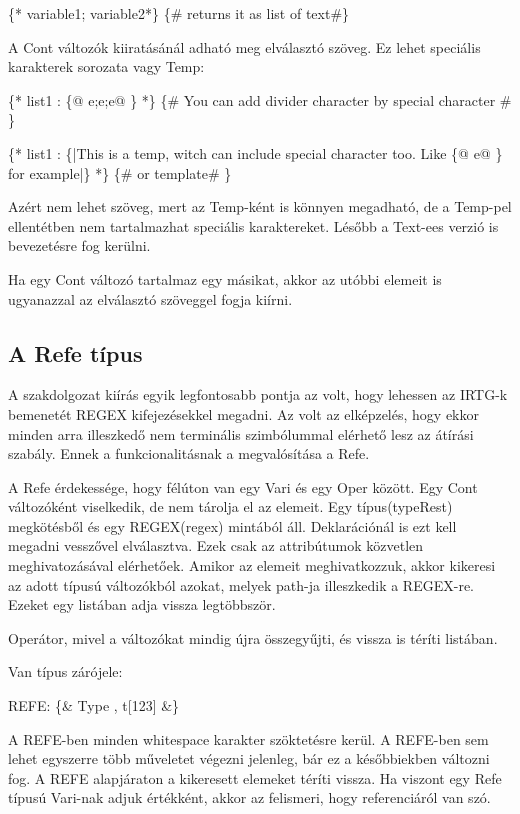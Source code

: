 {\{* variable1; variable2*\} \{\# returns it as list of text\#\}

A Cont változók kiiratásánál adható meg elválasztó szöveg.
Ez lehet speciális karakterek sorozata vagy Temp:

\{* list1 : \{@ e;e;e@ \} *\} \{\# You can add divider character by special character \#  \}

\{* list1 : \{|This is a temp, witch can include special character too. Like \{@ e@ \} for example|\} *\} \{\# or template\# \}

Azért nem lehet szöveg, mert az Temp-ként is könnyen megadható, de a Temp-pel ellentétben nem tartalmazhat speciális karaktereket.
Lésőbb a Text-ees verzió is bevezetésre fog kerülni.

Ha egy Cont változó tartalmaz egy másikat, akkor az utóbbi elemeit is ugyanazzal az elválasztó szöveggel fogja kiírni. 

\subsection{A Refe típus}

A szakdolgozat kiírás egyik legfontosabb pontja az volt, hogy lehessen az IRTG-k bemenetét REGEX kifejezésekkel megadni.
Az volt az elképzelés, hogy ekkor minden arra illeszkedő nem terminális szimbólummal elérhető lesz az átírási szabály.
Ennek a funkcionalitásnak a megvalósítása a Refe.

A Refe érdekessége, hogy félúton van egy Vari és egy Oper között. 
Egy Cont változóként viselkedik, de nem tárolja el az elemeit.
Egy típus(typeRest) megkötésből és egy REGEX(regex) mintából áll. 
Deklarációnál is ezt kell megadni vesszővel elválasztva.
Ezek csak az attribútumok közvetlen meghivatozásával elérhetőek. 
Amikor az elemeit meghivatkozzuk, akkor kikeresi az adott típusú változókból azokat,
melyek path-ja illeszkedik a REGEX-re.
Ezeket egy listában adja vissza legtöbbször.

Operátor, mivel a változókat mindig újra összegyűjti, és vissza is téríti listában.

Van típus zárójele:

REFE: \{\& Type , t[123] \&\}

A REFE-ben minden whitespace karakter szöktetésre kerül.
A REFE-ben sem lehet egyszerre több műveletet végezni jelenleg, bár ez a későbbiekben változni fog.
A REFE alapjáraton a kikeresett elemeket téríti vissza.
Ha viszont egy Refe típusú Vari-nak adjuk értékként, akkor az felismeri, hogy referenciáról van szó.

}
